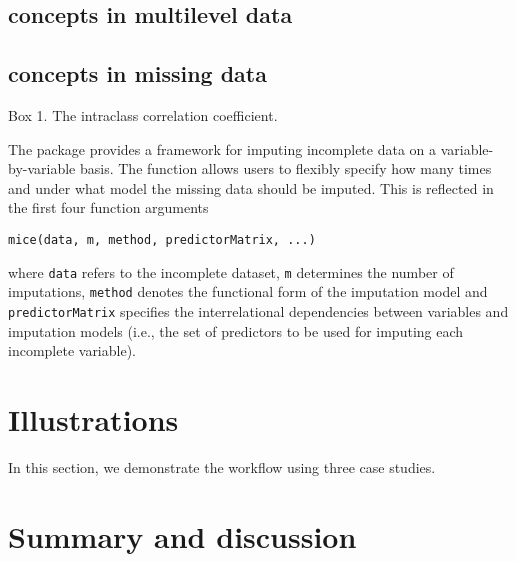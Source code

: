 \documentclass[
  article]{jss}
\newcommand{\fct}[1]{\code{#1()}}
\begin{document}
\hypertarget{concepts-in-multilevel-data}{%
\subsection{concepts in multilevel
data}\label{concepts-in-multilevel-data}}

\hypertarget{concepts-in-missing-data}{%
\subsection{concepts in missing data}\label{concepts-in-missing-data}}

\begin{tcolorbox}[enhanced jigsaw, colback=white, rightrule=.15mm, left=2mm, breakable, arc=.35mm, opacityback=0, leftrule=.75mm, toprule=.15mm, bottomrule=.15mm]

Box 1. The intraclass correlation coefficient.

\end{tcolorbox}

The  package  provides a framework for imputing
incomplete data on a variable-by-variable basis. The \fct{mice} function
allows users to flexibly specify how many times and under what model the
missing data should be imputed. This is reflected in the first four
function arguments

\begin{verbatim}
mice(data, m, method, predictorMatrix, ...)
\end{verbatim}

where \texttt{data} refers to the incomplete dataset, \texttt{m}
determines the number of imputations, \texttt{method} denotes the
functional form of the imputation model and \texttt{predictorMatrix}
specifies the interrelational dependencies between variables and
imputation models (i.e., the set of predictors to be used for imputing
each incomplete variable).

\hypertarget{sec-illustrations}{%
\section{Illustrations}\label{sec-illustrations}}

In this section, we demonstrate the workflow using three case studies.

\hypertarget{sec-summary}{%
\section{Summary and discussion}\label{sec-summary}}
\end{document}
